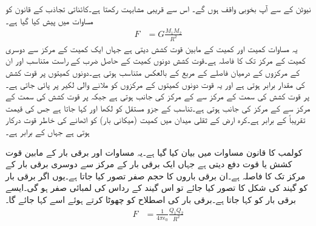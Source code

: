 نیوٹن کے  سے آپ بخوبی واقف ہوں گے۔ اس سے قریبی مشابہت رکھتا ہے۔کائناتی تجاذب کے قانون کو مساوات  میں پیش کیا گیا ہے۔
\begin{align}\label{مساوات_کولوم_کشش_ثقل}
F&=G \frac{M_1 M_2}{R^2}
\end{align}
یہ مساوات کمیت  اور کمیت  کے مابین قوت کشش  دیتی ہے جہاں ایک کمیت کے مرکز سے دوسری کمیت کے مرکز تک کا فاصلہ  ہے۔قوت کشش دونوں کمیت کے حاصل ضرب کے  راست متناسب اور ان کے مرکزوں کے درمیان فاصلے  کے مربع کے بالعکس متناسب ہوتی ہے۔دونوں کمیتوں پر قوت کشش کی مقدار برابر ہوتی ہے اور یہ قوت دونوں کمیتوں کے  مرکزوں  کو ملانے والی لکیر پر پائی جاتی ہے۔ پر قوت کشش کی سمت  کے مرکز سے  کے مرکز کی جانب  ہوتی ہے جبکہ  پر قوت کشش کی سمت  کے مرکز سے  کے مرکز کی جانب ہوتی ہے۔تناسب کے جزو مستقل کو  لکھا اور  کہا جاتا ہے جس کی قیمت تقریباً  کے برابر ہے۔کرہ ارض کے ثقلی میدان میں  کمیت (میکانی بار)  کو اٹھانے کی خاطر  قوت درکار ہوتی  ہے جہاں  کے برابر ہے۔

کولمب کا قانون مساوات  میں بیان کیا گیا ہے۔یہ مساوات   اور برقی بار  کے مابین قوت کشش یا قوت دفع  دیتی ہے جہاں ایک برقی بار کے مرکز سے دوسری برقی بار کے مرکز تک کا فاصلہ  ہے۔ان برقی باروں کا حجم صفر تصور کیا جاتا ہے۔یوں اگر برقی بار کو گیند کی شکل کا تصور کیا جائے تو اس گیند کے رداس  کی لمبائی صفر ہو گی۔ایسے برقی بار کو  کہا جاتا ہے۔برقی بار کی اصطلاح کو چھوٹا کرتے ہوئے اسے  کہا جائے گا۔
\begin{align}\label{مساوات_کولوم_کولمب_کشش_بار}
F&=\frac{1}{4 \pi \epsilon_0}\frac{Q_1 Q_2}{ R^2}
\end{align}

